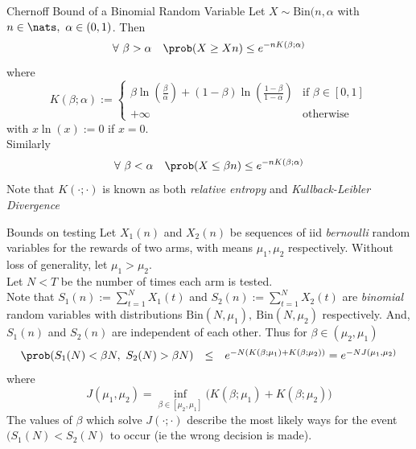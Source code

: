 \documentclass[11pt,a4paper]{article}
\begin{document}
\begin{theorem}{Chernoff Bound of a Binomial Random Variable}
  Let $X\sim\text{Bin}(n,\alpha$ with $n\in\nats,\ \alpha\in(0,1)$. Then
  \[ \forall\ \beta>\alpha\quad\prob(X\geq Xn)\leq e^{-nK(\beta;\alpha)} \]
  where
  \[ K(\beta;\alpha):=\begin{cases}\beta\ln\left(\frac\beta\alpha\right)+(1-\beta)\ln\left(\frac{1-\beta}{1-\alpha}\right)&\text{if }\beta\in[0,1]\\+\infty&\text{otherwise}\end{cases} \]
  with $x\ln(x):=0$ if $x=0$.\\
  Similarly
  \[ \forall\ \beta<\alpha\quad\prob(X\leq\beta n)\leq e^{-nK(\beta;\alpha)} \]
  Note that $K(\cdot;\cdot)$ is known as both \textit{relative entropy} and \textit{Kullback-Leibler Divergence}
\end{theorem}

\begin{proposition}{Bounds on testing}
  Let $X_1(n)$ and $X_2(n)$ be sequences of iid \textit{bernoulli} random variables for the rewards of two arms, with means $\mu_1,\mu_2$ respectively. Without loss of generality, let $\mu_1>\mu_2$.\\
  Let $N<T$ be the number of times each arm is tested.\\
  Note that $S_1(n):=\sum_{t=1}^NX_1(t)$ and $S_2(n):=\sum_{t=1}^NX_2(t)$ are \textit{binomial} random variables with distributions $\text{Bin}(N,\mu_1),\ \text{Bin}(N,\mu_2)$ respectively. And, $S_1(n)$ and $S_2(n)$ are independent of each other. Thus for $\beta\in(\mu_2,\mu_1)$
  \[\begin{array}{rcl}
    \prob(S_1(N)<\beta N,\ S_2(N)>\beta N)&\leq&e^{-N(K(\beta;\mu_1)+K(\beta;\mu_2))}=e^{-NJ(\mu_1,\mu_2)}
  \end{array}\]
  where
  \[ J(\mu_1,\mu_2)=\inf_{\beta\in[\mu_2,\mu_1]}\big(K(\beta;\mu_1)+K(\beta;\mu_2)\big) \]
  The values of $\beta$ which solve $J(\cdot;\cdot)$ describe the most likely ways for the event $(S_1(N)<S_2(N)$ to occur (ie the wrong decision is made).
\end{proposition}
\end{document}
